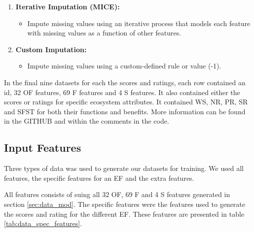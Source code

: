 \documentclass[12pt,letterpaper]{article}
\begin{document}
\begin{enumerate}
\begin{itemize}
    \end{itemize}

    \item \textbf{Iterative Imputation (MICE):}
    \begin{itemize}
        \item  Impute missing values using an iterative process that models each feature with missing values as a function of other features.

    \end{itemize}

    \item \textbf{Custom Imputation:}
    \begin{itemize}
        \item  Impute missing values using a custom-defined rule or value  (-1).
    \end{itemize}
    
\end{enumerate}

In the final nine datasets for each the scores and ratings, each row contained an id, 32 OF features, 69 F features and 4 S features.
It also contained either the scores or ratings for specific ecosystem attributes.
It contained \ac{WS}, \ac{NR}, \ac{PR}, \ac{SR} and \ac{SFST} for both their functions and benefits.
More information can be found in the GITHUB and within the comments in the code.

\subsection{Input Features}
Three types of data was used to generate our datasets for training.
We used all features, the specific features for an \ac{EF} and the extra features.

All features consists of suing all 32 OF, 69 F and 4 S features generated in section \ref{sec:data_mod}.
 The specific features were the features used to generate the scores and rating for the different \ac{EF}.
 These features are presented in table \ref{tab:data_spec_features}.
\end{document}
